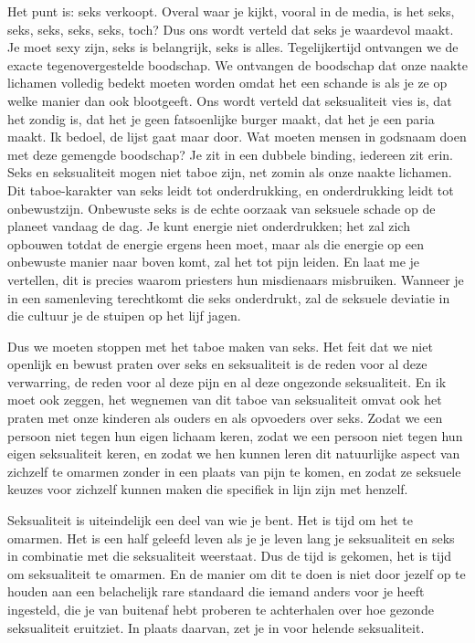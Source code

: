 Het punt is: seks verkoopt. Overal waar je kijkt, vooral in de media, is het seks, seks, seks, seks, seks, toch? Dus ons wordt verteld dat seks je waardevol maakt. Je moet sexy zijn, seks is belangrijk, seks is alles. Tegelijkertijd ontvangen we de exacte tegenovergestelde boodschap. We ontvangen de boodschap dat onze naakte lichamen volledig bedekt moeten worden omdat het een schande is als je ze op welke manier dan ook blootgeeft. Ons wordt verteld dat seksualiteit vies is, dat het zondig is, dat het je geen fatsoenlijke burger maakt, dat het je een paria maakt. Ik bedoel, de lijst gaat maar door. Wat moeten mensen in godsnaam doen met deze gemengde boodschap? Je zit in een dubbele binding, iedereen zit erin. Seks en seksualiteit mogen niet taboe zijn, net zomin als onze naakte lichamen. Dit taboe-karakter van seks leidt tot onderdrukking, en onderdrukking leidt tot onbewustzijn. Onbewuste seks is de echte oorzaak van seksuele schade op de planeet vandaag de dag. Je kunt energie niet onderdrukken; het zal zich opbouwen totdat de energie ergens heen moet, maar als die energie op een onbewuste manier naar boven komt, zal het tot pijn leiden. En laat me je vertellen, dit is precies waarom priesters hun misdienaars misbruiken. Wanneer je in een samenleving terechtkomt die seks onderdrukt, zal de seksuele deviatie in die cultuur je de stuipen op het lijf jagen.

Dus we moeten stoppen met het taboe maken van seks. Het feit dat we niet openlijk en bewust praten over seks en seksualiteit is de reden voor al deze verwarring, de reden voor al deze pijn en al deze ongezonde seksualiteit. En ik moet ook zeggen, het wegnemen van dit taboe van seksualiteit omvat ook het praten met onze kinderen als ouders en als opvoeders over seks. Zodat we een persoon niet tegen hun eigen lichaam keren, zodat we een persoon niet tegen hun eigen seksualiteit keren, en zodat we hen kunnen leren dit natuurlijke aspect van zichzelf te omarmen zonder in een plaats van pijn te komen, en zodat ze seksuele keuzes voor zichzelf kunnen maken die specifiek in lijn zijn met henzelf.

Seksualiteit is uiteindelijk een deel van wie je bent. Het is tijd om het te omarmen. Het is een half geleefd leven als je je leven lang je seksualiteit en seks in combinatie met die seksualiteit weerstaat. Dus de tijd is gekomen, het is tijd om seksualiteit te omarmen. En de manier om dit te doen is niet door jezelf op te houden aan een belachelijk rare standaard die iemand anders voor je heeft ingesteld, die je van buitenaf hebt proberen te achterhalen over hoe gezonde seksualiteit eruitziet. In plaats daarvan, zet je in voor helende seksualiteit.
